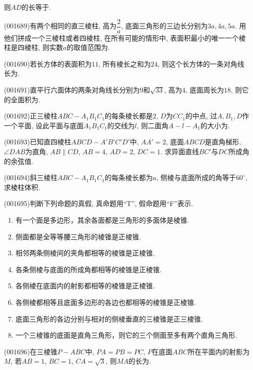 则$AD$的长等于.
\item (001689)有两个相同的直三棱柱, 高为$\dfrac{2}{a}$, 底面三角形的三边长分别为$3a,4a,5a$. 用他们拼成一个三棱柱或者四棱柱, 在所有可能的情形中, 表面积最小的唯一一个棱柱是四棱柱, 则实数$a$的取值范围为.
\item (001690)若长方体的表面积为$11$, 所有棱长之和为$24$, 则这个长方体的一条对角线长为.
\item (001691)直平行六面体的两条对角线长分别为$9$和$\sqrt{33}$, 高为$4$, 底面周长为$18$, 则它的全面积为.
\item (001692)正三棱柱$ABC-A_1B_1C_1$的每条棱长都是$2$, $D$为$CC_1$的中点, 过$A,B_1,D$作一个平面, 设此平面与底面$A_1B_1C_1$的交线为$l$, 则二面角$A-l-A_1$的大小为.
\item (001693)已知直四棱柱$ABCD-A'B'C'D'$中, $AA'=2$, 底面$ABCD$是直角梯形, $\angle DAB$为直角, $AB\parallel CD$, $AB=4$, $AD=2$, $DC=1$. 求异面直线$BC'$与$DC$所成角的余弦值.
\item (001694)斜三棱柱$ABC-A_1B_1C_1$的每条棱长都为$a$, 侧棱与底面所成的角等于$60^\circ$,
求棱柱体积.
\item (001695)判断下列命题的真假, 真命题用``{\textrm T}'', 假命题用``{\textrm F}''表示.\\ 
\begin{enumerate}[\blank{30}(1)]
\item 有一个面是多边形，其余各面都是三角形的多面体是棱锥.\\ 
\item 侧面都是全等等腰三角形的棱锥是正棱锥.\\ 
\item 相邻两条侧棱间的夹角都相等的棱锥是正棱锥.\\ 
\item 各条侧棱与底面的所成角都相等的棱锥是正棱锥.\\ 
\item 各侧棱在底面内的射影都相等的棱锥是正棱锥.\\ 
\item 各侧棱都相等且底面多边形的各边也都相等的棱锥是正棱锥.\\ 
\item 底面三角形的各边分别与相对的侧棱垂直的三棱锥是正三棱锥.\\ 
\item 一个三棱锥的底面是直角三角形，则它的三个侧面至多有两个直角三角形.
\end{enumerate}
\item (001696)在三棱锥$P-ABC$中, $PA=PB=PC$, $P$在底面$ABC$所在平面内的射影为$M$, 若$AB=1$, $BC=1$, $CA=\sqrt{3}$, 则$MA$的长为.
